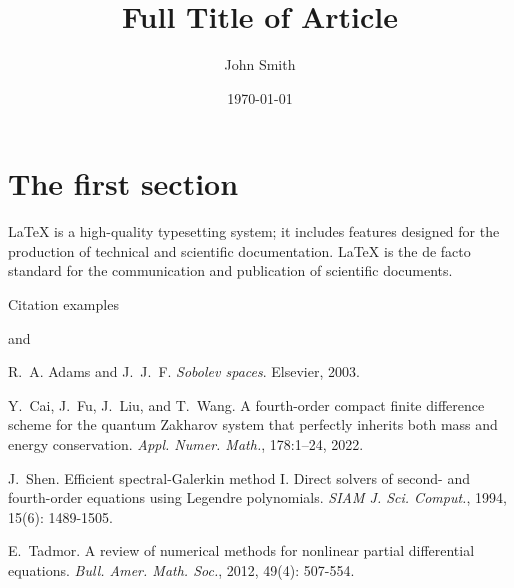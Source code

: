 \documentclass{article}
\title{Full Title of Article}
\author{John Smith}
\date{\today}
\begin{document}
\maketitle

\section{The first section}
LaTeX is a high-quality typesetting system; it includes features designed for the production of technical and scientific documentation. LaTeX is the de facto standard for the communication and publication of scientific documents.

Citation examples \cite{Tadmor2012,Shen1994,CaiFuLiuWang2022}

\cite{Adams2003,Tadmor2012} and \cite{Shen1994}

\begin{thebibliography}{9} %

 R.~A. Adams and J.~J.~F. {\em Sobolev spaces}. Elsevier, 2003.

 Y.~Cai, J.~Fu, J.~Liu, and T.~Wang. A fourth-order compact finite difference scheme for the quantum Zakharov system that perfectly inherits both mass and energy conservation. {\em Appl. Numer. Math.}, 178:1--24, 2022.

 J.~Shen. Efficient spectral-Galerkin method I. Direct solvers of second- and fourth-order equations using Legendre polynomials. {\em SIAM J. Sci. Comput.}, 1994, 15(6): 1489-1505.

 E.~Tadmor. A review of numerical methods for nonlinear partial differential equations.
{\em Bull. Amer. Math. Soc.}, 2012, 49(4): 507-554.
\end{thebibliography}
\end{document}
